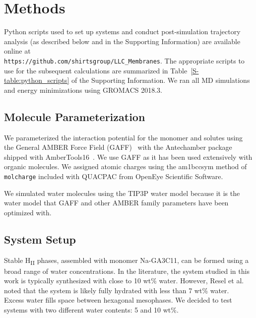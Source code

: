 \documentclass[journal=jpcbfk,manuscript=article]{achemso}
\begin{document}
  \section{Methods}
  
  Python scripts used to set up systems and conduct post-simulation trajectory 
  analysis (as described below and in the Supporting Information) are available 
  online at \\
  \texttt{https://github.com/shirtsgroup/LLC\_Membranes}. The 
  appropriate scripts to use for the subsequent calculations are summarized in 
  Table~\ref{S-table:python_scripts} of the Supporting Information. We ran all 
  MD simulations and energy minimizations using GROMACS 2018.3.~\cite{bekker_gromacs:_1993,berendsen_gromacs:_1995,van_der_spoel_gromacs:_2005,hess_gromacs_2008} 
  
  \subsection{Molecule Parameterization}\label{method:parameterization}
  
  We parameterized the interaction potential for the monomer and solutes using
  the General AMBER Force Field (GAFF)~\cite{wang_development_2004} with the
  Antechamber package \cite{wang_automatic_2006} shipped with
  AmberTools16~\cite{case_ambertools16_2016}. We use GAFF as it has been used
  extensively with organic molecules. We assigned atomic charges using the
  am1bccsym method of \texttt{molcharge} included with QUACPAC from OpenEye
  Scientific Software.
  
  We simulated water molecules using the TIP3P water model because it is the
  water model that GAFF and other AMBER family parameters have been optimized
  with.~\cite{florova_explicit_2010,ponder_force_2003}
  
  \subsection{System Setup}\label{method:system_setup}

  Stable H\textsubscript{II} phases, assembled with monomer Na-GA3C11, can be formed
  using a broad range of water concentrations. In the literature, the system 
  studied in this work is typically synthesized with close to 10 wt\% water.
  \cite{smith_ordered_1997, zhou_new_2007} However, Resel et al. noted that the
  system is likely fully hydrated with less than 7 wt\% water.~\cite{resel_h2-phase_2000}
  Excess water fills space between hexagonal mesophases. We decided to test 
  systems with two different water contents: 5 and 10 wt\%.
  
\end{document}
